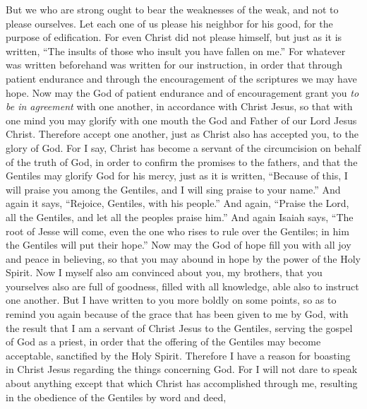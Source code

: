 \begin{biblechapter} %
 But we who are strong ought to bear the weaknesses of the weak, and not to please ourselves.
\verse Let each one of us please his neighbor for his good, for the purpose of edification.
\verse For even Christ did not please himself, but just as it is written, “The insults of those who insult you have fallen on me.”
\verse For whatever was written beforehand was written for our instruction, in order that through patient endurance and through the encouragement of the scriptures we may have hope.
\verse Now may the God of patient endurance and of encouragement grant you \textit{to be in agreement} with one another, in accordance with Christ Jesus,
\verse so that with one mind you may glorify with one mouth the God and Father of our Lord Jesus Christ.
\verse Therefore accept one another, just as Christ also has accepted you, to the glory of God.
\verse For I say, Christ has become a servant of the circumcision on behalf of the truth of God, in order to confirm the promises to the fathers,
\verse and that the Gentiles may glorify God for his mercy, just as it is written, “Because of this, I will praise you among the Gentiles, 
and I will sing praise to your name.”
\verse And again it says, “Rejoice, Gentiles, with his people.”
\verse And again, “Praise the Lord, all the Gentiles, 
and let all the peoples praise him.”
\verse And again Isaiah says, “The root of Jesse will come, 
even the one who rises to rule over the Gentiles; 
in him the Gentiles will put their hope.”
\verse Now may the God of hope fill you with all joy and peace in believing, so that you may abound in hope by the power of the Holy Spirit.
 Now I myself also am convinced about you, my brothers, that you yourselves also are full of goodness, filled with all knowledge, able also to instruct one another.
\verse But I have written to you more boldly on some points, so as to remind you again because of the grace that has been given to me by God,
\verse with the result that I am a servant of Christ Jesus to the Gentiles, serving the gospel of God as a priest, in order that the offering of the Gentiles may become acceptable, sanctified by the Holy Spirit.
\verse Therefore I have a reason for boasting in Christ Jesus regarding the things concerning God.
\verse For I will not dare to speak about anything except that which Christ has accomplished through me, resulting in the obedience of the Gentiles by word and deed,

\end{biblechapter}

